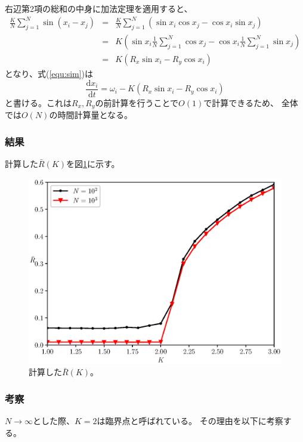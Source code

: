 \documentclass[a4j, titlepage]{jsarticle}
\numberwithin{equation}{section}
\begin{document}
            右辺第2項の総和の中身に加法定理を適用すると、
            \begin{eqnarray*}
                \frac{K}{N}\sum^N_{j=1}\sin(x_i-x_j) &=& \frac{K}{N}\sum^N_{j=1}(\sin x_i\cos x_j - \cos x_i \sin x_j) \\
                &=& K\left(\sin x_i\frac{1}{N}\sum^N_{j=1}\cos x_j - \cos x_i\frac{1}{N}\sum^N_{j=1}\sin x_j\right) \\
                &=& K (R_x\sin x_i - R_y\cos x_i)
            \end{eqnarray*}
            となり、式(\ref{equ:sim})は
            \begin{equation*}
                \frac{\mathrm{d}x_i}{\mathrm{d}t} = \omega_i - K (R_x\sin x_i - R_y\cos x_i)
            \end{equation*}
            と書ける。これは$R_x, R_y$の前計算を行うことで$O(1)$で計算できるため、
            全体では$O(N)$の時間計算量となる。

        \subsubsection{結果}
            計算した$\bar{R}(K)$を図\ref{fig:8}に示す。
            \begin{figure}[h]
                \centering
                \includegraphics[width=0.8\hsize]{kadai8/8.eps}
                \caption{
                    計算した$\bar{R}(K)$。
                }
                \label{fig:8}
            \end{figure}

        \subsubsection{考察}
            $N\rightarrow\infty$とした際、$K=2$は臨界点と呼ばれている。
            その理由を以下に考察する。
\end{document}

